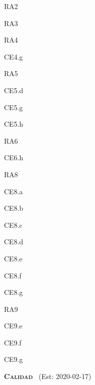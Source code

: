 \begin{longenum}
\begin{longenum}
\begin{longenum}
            \begin{longenum}
                \item RA2
                \item RA3
                \item RA4
                \begin{longenum}
                    \item CE4.g
                \end{longenum}
                \item RA5
                \begin{longenum}
                    \item CE5.d
                    \item CE5.g
                    \item CE5.h
                \end{longenum}
                \item RA6
                \begin{longenum}
                    \item CE6.h
                \end{longenum}
                \item RA8
                \begin{longenum}
                    \item CE8.a
                    \item CE8.b
                    \item CE8.c
                    \item CE8.d
                    \item CE8.e
                    \item CE8.f
                    \item CE8.g
                \end{longenum}
                \item RA9
                \begin{longenum}
                    \item CE9.e
                    \item CE9.f
                    \item CE9.g
                \end{longenum}
            \end{longenum}
        \end{longenum}
    \end{longenum}
    \item \textbf{\textsc{Calidad}} \ (Est: 2020-02-17)

\end{longenum}
